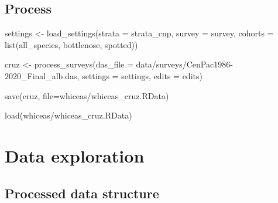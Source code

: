 \documentclass[
]{book}
\newenvironment{Shaded}{\begin{snugshade}}{\end{snugshade}}
\newcommand{\AttributeTok}[1]{\textcolor[rgb]{0.77,0.63,0.00}{#1}}
\newcommand{\FunctionTok}[1]{\textcolor[rgb]{0.00,0.00,0.00}{#1}}
\newcommand{\NormalTok}[1]{#1}
\newcommand{\OtherTok}[1]{\textcolor[rgb]{0.56,0.35,0.01}{#1}}
\newcommand{\StringTok}[1]{\textcolor[rgb]{0.31,0.60,0.02}{#1}}
\begin{document}
\hypertarget{process}{%
\subsection*{Process}\label{process}}

\begin{Shaded}
\begin{Highlighting}[]
\NormalTok{settings }\OtherTok{\textless{}{-}} \FunctionTok{load\_settings}\NormalTok{(}\AttributeTok{strata =}\NormalTok{ strata\_cnp,}
                          \AttributeTok{survey =}\NormalTok{ survey,}
                          \AttributeTok{cohorts =} \FunctionTok{list}\NormalTok{(all\_species,}
\NormalTok{                                         bottlenose,}
\NormalTok{                                         spotted))}

\NormalTok{cruz }\OtherTok{\textless{}{-}} 
  \FunctionTok{process\_surveys}\NormalTok{(}\AttributeTok{das\_file =} \StringTok{\textquotesingle{}data/surveys/CenPac1986{-}2020\_Final\_alb.das\textquotesingle{}}\NormalTok{,}
                  \AttributeTok{settings =}\NormalTok{ settings,}
                  \AttributeTok{edits =}\NormalTok{ edits) }

\FunctionTok{save}\NormalTok{(cruz, }\AttributeTok{file=}\StringTok{\textquotesingle{}whiceas/whiceas\_cruz.RData\textquotesingle{}}\NormalTok{)}
\end{Highlighting}
\end{Shaded}

\begin{Shaded}
\begin{Highlighting}[]
\FunctionTok{load}\NormalTok{(}\StringTok{\textquotesingle{}whiceas/whiceas\_cruz.RData\textquotesingle{}}\NormalTok{)}
\end{Highlighting}
\end{Shaded}

\hypertarget{data-exploration}{%
\section*{Data exploration}\label{data-exploration}}

\hypertarget{processed-data-structure}{%
\subsection*{Processed data structure}\label{processed-data-structure}}
\end{document}
